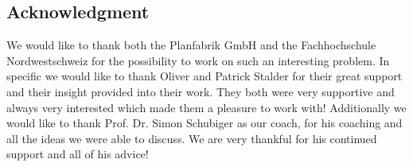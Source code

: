\subsection{Acknowledgment}
We would like to thank both the Planfabrik GmbH and the Fachhochschule Nordwestschweiz for the possibility to work on such an interesting problem. In specific we would like to thank Oliver and Patrick Stalder for their great support and their insight provided into their work. They both were very supportive and always very interested which made them a pleasure to work with! Additionally we would like to thank Prof. Dr. Simon Schubiger as our coach, for his coaching and all the ideas we were able to discuss. We are very thankful for his continued support and all of his advice!